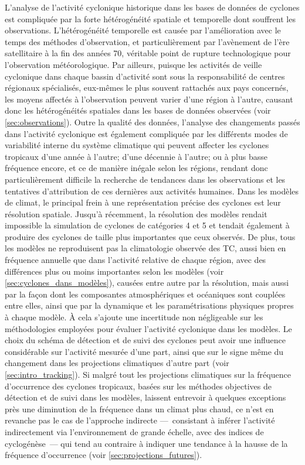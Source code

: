 \documentclass[../main.tex]{subfiles}
\begin{document}
L'analyse de l'activité cyclonique historique dans les bases de données de cyclones est compliquée par la forte hétérogénéité spatiale et temporelle dont
souffrent les observations. L'hétérogénéité temporelle est causée par l'amélioration avec le temps des méthodes d'observation, et particulièrement par
l'avènement de l'ère satellitaire à la fin des années \num{70}, véritable point de rupture technologique pour l'observation météorologique. Par ailleurs,
puisque les activités de veille cyclonique dans chaque bassin d'activité sont sous la responsabilité de centres régionaux spécialisés, eux-mêmes le plus souvent
rattachés aux pays concernés, les moyens affectés à l'observation peuvent varier d'une région à l'autre, causant donc les hétérogénéités spatiales dans les
bases de données observées (voir \cref{sec:observations}). Outre la qualité des données, l'analyse des changements passés dans l'activité cyclonique est
également compliquée par les différents modes de variabilité interne du système climatique qui peuvent affecter les cyclones tropicaux d'une année à l'autre;
d'une décennie à l'autre; ou à plus basse fréquence encore, et ce de manière inégale selon les régions, rendant donc particulièrement difficile la recherche de
tendances dans les observations et les tentatives d'attribution de ces dernières aux activités humaines. Dans les modèles de climat, le principal frein à une
représentation précise des cyclones est leur résolution spatiale. Jusqu'à récemment, la résolution des modèles rendait impossible la simulation de cyclones de
catégories \num{4} et \num{5} et tendait également à produire des cyclones de taille plus importantes que ceux observés. De plus, tous les modèles ne
reproduisent pas la climatologie observée des TC, aussi bien en fréquence annuelle que dans l'activité relative de chaque région, avec des différences plus ou
moins importantes selon les modèles (voir \cref{sec:cyclones_dans_modèles}), causées entre autre par la résolution, mais aussi par la façon dont les composantes
atmosphériques et océaniques sont couplées entre elles, ainsi que par la dynamique et les paramétrisations physiques propres à chaque modèle. À cela s'ajoute
une incertitude non négligeable sur les méthodologies employées pour évaluer l'activité cyclonique dans les modèles. Le choix du schéma de détection et de suivi
des cyclones peut avoir une influence considérable sur l'activité mesurée d'une part, ainsi que sur le signe même du changement dans les projections climatiques
d'autre part (voir \cref{sec:intro_tracking}). Si malgré tout les projections climatiques sur la fréquence d'occurrence des cyclones tropicaux, basées sur les
méthodes objectives de détection et de suivi dans les modèles, laissent entrevoir à quelques exceptions près une diminution de la fréquence dans un climat plus
chaud, ce n'est en revanche pas le cas de l'approche indirecte ---~consistant à inférer l'activité indirectement via l'environnement de grande échelle, avec des
indices de cyclogénèse~--- qui tend au contraire à indiquer une tendance à la hausse de la fréquence d'occurrence (voir \cref{sec:projections_futures}).
\end{document}
